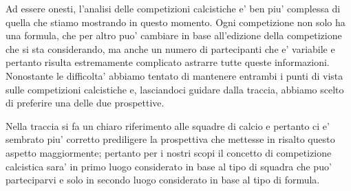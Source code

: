 Ad essere onesti, l'analisi delle competizioni calcistiche e' ben piu' complessa di quella
che stiamo mostrando in questo momento. Ogni competizione non solo ha una formula, che per altro
puo' cambiare in base all'edizione della competizione che si sta considerando, ma anche un numero
di partecipanti che e' variabile e pertanto risulta estremamente complicato astrarre tutte
queste informazioni.
Nonostante le difficolta' abbiamo tentato di mantenere entrambi i punti di vista sulle
competizioni calcistiche e, lasciandoci guidare dalla traccia, abbiamo scelto di preferire una
delle due prospettive.

Nella traccia si fa un chiaro riferimento alle squadre di calcio e pertanto ci e' sembrato
piu' corretto prediligere la prospettiva che mettesse in risalto questo aspetto maggiormente;
pertanto per i nostri scopi il concetto di competizione calcistica sara' in primo luogo
considerato in base al tipo di squadra che puo' parteciparvi e solo in secondo luogo
considerato in base al tipo di formula.